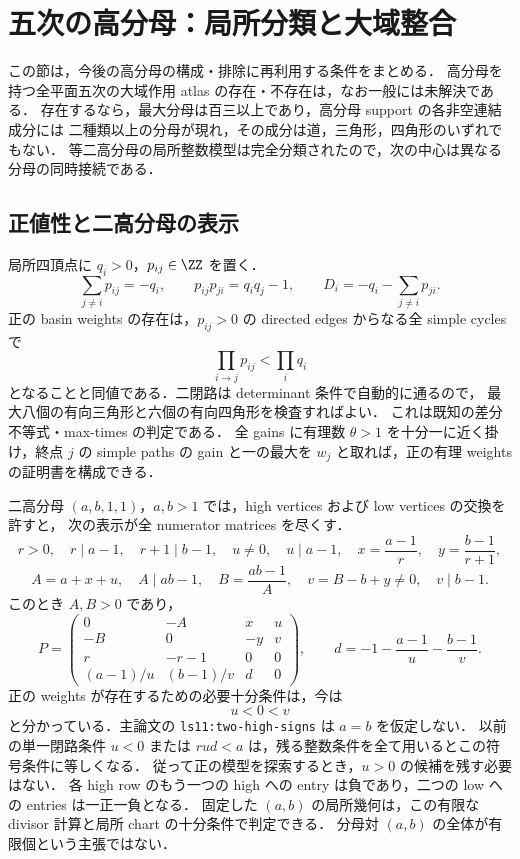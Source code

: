 \section{五次の高分母：局所分類と大域整合}
\label{nt10:denominators}

この節は，今後の高分母の構成・排除に再利用する条件をまとめる．
高分母を持つ全平面五次の大域作用 atlas の存在・不存在は，なお一般には未解決である．
存在するなら，最大分母は百三以上であり，高分母 support の各非空連結成分には
二種類以上の分母が現れ，その成分は道，三角形，四角形のいずれでもない．
等二高分母の局所整数模型は完全分類されたので，次の中心は異なる分母の同時接続である．

\subsection{正値性と二高分母の表示}

局所四頂点に $q_i>0$，$p_{ij}\in\ZZ$ を置く．
\[
 \sum_{j\ne i}p_{ij}=-q_i,\qquad
 p_{ij}p_{ji}=q_iq_j-1,\qquad
 D_i=-q_i-\sum_{j\ne i}p_{ji}.
\]
正の basin weights の存在は，$p_{ij}>0$ の directed edges からなる全 simple cycles で
\[
 \prod_{i\to j}p_{ij}<\prod_iq_i
\]
となることと同値である．二閉路は determinant 条件で自動的に通るので，
最大八個の有向三角形と六個の有向四角形を検査すればよい．
これは既知の差分不等式・max-times の判定\cite[\S2]{SergeevSchneiderButkovic}である．
全 gains に有理数 $\theta>1$ を十分一に近く掛け，終点 $j$ の simple paths の gain と一の最大を
$w_j$ と取れば，正の有理 weights の証明書を構成できる．

二高分母 $(a,b,1,1)$，$a,b>1$ では，high vertices および low vertices の交換を許すと，
次の表示が全 numerator matrices を尽くす．
\[
 r>0,\quad r\mid a-1,\quad r+1\mid b-1,\quad
 u\ne0,\quad u\mid a-1,\quad
 x=\frac{a-1}{r},\quad y=\frac{b-1}{r+1},
\]
\[
 A=a+x+u,\quad A\mid ab-1,\quad
 B=\frac{ab-1}{A},\quad v=B-b+y\ne0,\quad v\mid b-1.
\]
このとき $A,B>0$ であり，
\[
 P=\begin{pmatrix}
 0&-A&x&u\\
 -B&0&-y&v\\
 r&-r-1&0&0\\
 (a-1)/u&(b-1)/v&d&0
 \end{pmatrix},\qquad
 d=-1-\frac{a-1}{u}-\frac{b-1}{v}.
\]
正の weights が存在するための必要十分条件は，今は
\[
 u<0<v
\]
と分かっている．主論文の \texttt{ls11:two-high-signs} は $a=b$ を仮定しない．
以前の単一閉路条件 $u<0$ または $rud<a$ は，残る整数条件を全て用いるとこの符号条件に等しくなる．
従って正の模型を探索するとき，$u>0$ の候補を残す必要はない．
各 high row のもう一つの high への entry は負であり，二つの low への entries は一正一負となる．
固定した $(a,b)$ の局所幾何は，この有限な divisor 計算と局所 chart の十分条件で判定できる．
分母対 $(a,b)$ の全体が有限個という主張ではない．

